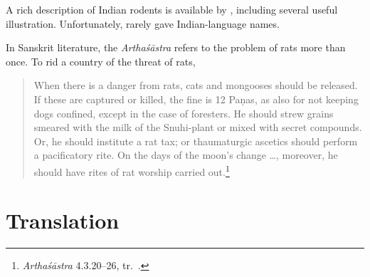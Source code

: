 A rich description of Indian rodents is available by \citet[ch.\,13,
esp.\,205--215]{bia}, including several useful illustration. 
Unfortunately, \citeauthor{bia} rarely gave Indian-language
names.

In Sanskrit literature, the \emph{Arthaśāstra} refers to the problem of rats 
more than once.  To rid a country of the threat of rats, 
\begin{quote}    
    When there is a danger from rats, cats and mongooses should be
released. If these are captured or killed, the fine is 12 Paṇas,
as also for not keeping dogs confined, except in the case of
foresters. He should strew grains smeared with the milk of the
Snuhi-plant or mixed with secret compounds. Or, he should
institute a rat tax; or thaumaturgic ascetics should perform a
pacificatory rite. On the days of the moon’s change \ldots,
moreover, he should have rites of rat worship carried
out.\footnote{\emph{Arthaśāstra} 4.3.20--26, tr.\ \cite[230]{oliv-2013}.}
\end{quote}

\newpage

\section{Translation}

